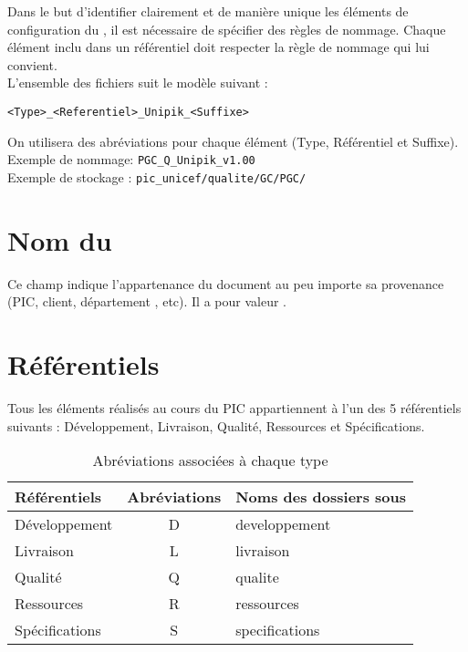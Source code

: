 
Dans le but d'identifier clairement et de manière unique les éléments de configuration du \picCourt{}, il est nécessaire de spécifier des règles de nommage. Chaque élément inclu dans un référentiel doit respecter la règle de nommage qui lui convient.\\

L'ensemble des fichiers suit le modèle suivant :
\begin{center}
  \verb+<Type>_<Referentiel>_Unipik_<Suffixe>+
\end{center}
On utilisera des abréviations pour chaque élément (Type, Référentiel et Suffixe).\\
Exemple de nommage: \verb+PGC_Q_Unipik_v1.00+\\
Exemple de stockage : \verb+pic_unicef/qualite/GC/PGC/+ 


\section{Nom du \picCourt{}}
Ce champ indique l'appartenance du document au \PICCourt{} peu importe sa provenance
 (PIC, client, département \ASI{}, etc). Il a pour valeur \textbf{\nomEquipe}.

\section{Référentiels}

Tous les éléments réalisés au cours du PIC appartiennent à l'un des 5 référentiels suivants : Développement, Livraison, Qualité, Ressources et Spécifications.
\begin{table}[H]
\centering
	\begin{tabularx}{11cm}{|X|c|X|}
	\hline
	\rowcolor[gray]{0.85} Référentiels & Abréviations & Noms des dossiers sous \git{} \\
	\hline
	Développement & D & developpement\\
	\hline
	Livraison & L & livraison\\
	\hline
	Qualité & Q & qualite\\
	\hline	
	Ressources & R & ressources\\
	\hline 
	Spécifications & S & specifications\\ 
	\hline
	\end{tabularx}
\caption{Abréviations associées à chaque type}
\label{Référentiel}
\end{table}

